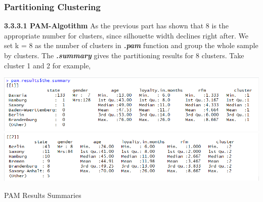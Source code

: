 \documentclass[a4paper,12pt,fleqn]{article}
\begin{document}
\subsubsection{Partitioning Clustering}%
\textbf{3.3.3.1 PAM-Algotithm}
As the previous part has shown that 8 is the appropriate number for clusters, since silhouette width declines right after. We set k = 8 as the number of clusters in \textbf{\textit{.pam}} function and group the whole sample by clusters. The \textbf{\textit{.summary}} gives the partitioning results for 8 clusters. Take cluster 1 and 2 for example,\\
\begin{table}[h]
	\centering
	\includegraphics[width=0.95\linewidth]{"12.pam results summary 1"}
	\includegraphics[width=0.95\linewidth]{"12.pam results summary2"}
	\caption{PAM Results Summaries}
	\label{fig:12}
\end{table}\\
\end{document}
